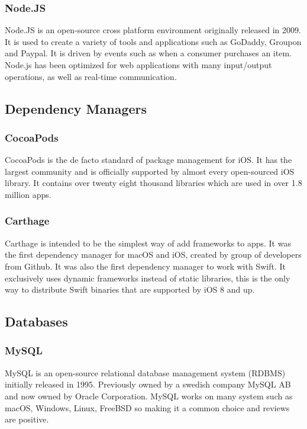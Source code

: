 \subsubsection{Node.JS}
Node.JS \cite{node} is an open-source cross platform environment originally released in 2009. It is used to create a variety of tools and applications such as GoDaddy, Groupon and Paypal.  It is driven by events such as when a consumer purchases an item. Node.js has been optimized for web applications with many input/output operations, as well as real-time communication.

\subsection{Dependency Managers}

\subsubsection{CocoaPods}

CocoaPods \cite{pods} is the de facto standard of package management for iOS. It has the largest community and is officially supported by almost every open-sourced iOS library. It contains over twenty eight thousand libraries which are used in over 1.8 million apps.

\subsubsection{Carthage}

Carthage \cite{carthage} is intended to be the simplest way of add frameworks to apps. It was the first dependency manager for macOS and iOS, created by group of developers from Github. It was also the first dependency manager to work with Swift. It exclusively uses dynamic frameworks instead of static libraries, this is the only way to distribute Swift binaries that are supported by iOS 8 and up.

\subsection{Databases}

\subsubsection{MySQL}
MySQL \cite{sql} is an open-source relational database management system (RDBMS) initially released in 1995. Previously owned by a swedish company MySQL AB and now owned by Oracle Corporation. MySQL works on many system such as macOS, Windows, Linux, FreeBSD so making it a common choice and reviews are positive.

